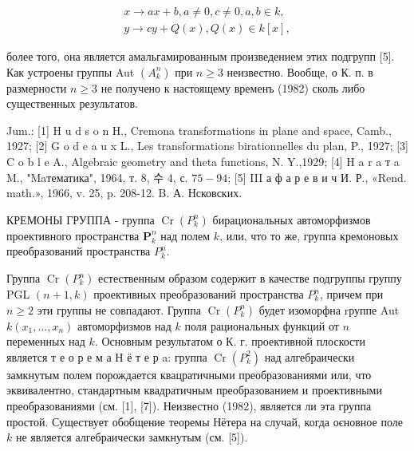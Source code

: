 \documentclass[10pt]{article}
\begin{document}
\[

\begin{gathered}

x \longrightarrow a x+b, a \neq 0, c \neq 0, a, b \in k, \\

y \longrightarrow c y+Q(x), Q(x) \in k[x],

\end{gathered}

\]



более того, она является амальгамированным произведением этих подгрупп [5]. Как устроены группы Aut $\left(A_{k}^{n}\right)$ при $n \geqslant 3$ неизвестно. Вообще, о К. п. в размерности $n \geqslant 3$ не получено к настоящему временъ (1982) сколь либо существенных результатов.



Jum.: [1] H u d s o n H., Cremona transformations in plane and space, Camb., 1927; [2] G o d e a u x L., Les transformations birationnelles du plan, P., 1927; [3] C o b l e A., Algebraic geometry and theta functions, N. Y.,1929; [4] H a r a т a M., "Maтематика", 1964, т. 8, 수 4, с. $75-94$; [5] III а ф а р е в и ч И. Р., «Rend. math.», 1966, v. 25, p. 208-12. B. А. Нсковских.



КРЕМОНЫ ГРУППА - группа $\operatorname{Cr}\left(P_{k}^{n}\right)$ бирациональных автоморфизмов проективного пространства $\boldsymbol{P}_{k}^{n}$ над полем $k$, или, что то же, группа кремоновых преобразований пространства $P_{k}^{n}$.



Группа $\operatorname{Cr}\left(P_{k}^{n}\right)$ естественным образом содержит в качестве подгруппы группу PGL $(n+1, k)$ проективных преобразований пространства $P_{k}^{n}$, причем при $n \geqslant 2$ эти группы не совпадают. Группа $\operatorname{Cr}\left(P_{k}^{n}\right)$ будет изоморфна rруппе Aut $k\left(x_{1}, \ldots, x_{n}\right)$ автоморфизмов над $k$ поля рациональных функций от $n$ переменных над $k$. Основным результатом о К. г. проективной плоскости является т е о р е м а Н ё т е р a: группа $\operatorname{Cr}\left(P_{k}^{2}\right)$ над алгебраически замкнутым полем порождается квацратичными преобразованиями или, что эквивалентно, стандартным квадратичным преобразованием и проективными преобразованиями (см. [1], [7]). Неизвестно (1982), является ли эта группа простой. Существует обобщение теоремы Нётера на случай, когда оєновное поле $k$ не является алгебраически замкнутым (см. [5]).
\end{document}
